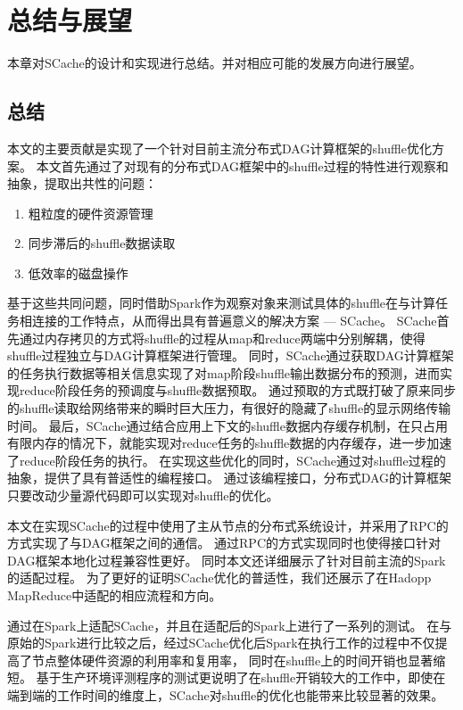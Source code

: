 
\chapter{总结与展望}
\label{chap:summary}

本章对SCache的设计和实现进行总结。并对相应可能的发展方向进行展望。

\section{总结}

本文的主要贡献是实现了一个针对目前主流分布式DAG计算框架的shuffle优化方案。
本文首先通过了对现有的分布式DAG框架中的shuffle过程的特性进行观察和抽象，提取出共性的问题：
\begin{enumerate}
    \item 粗粒度的硬件资源管理
    \item 同步滞后的shuffle数据读取
    \item 低效率的磁盘操作
\end{enumerate}
基于这些共同问题，同时借助Spark作为观察对象来测试具体的shuffle在与计算任务相连接的工作特点，从而得出具有普遍意义的解决方案 --- SCache。
SCache首先通过内存拷贝的方式将shuffle的过程从map和reduce两端中分别解耦，使得shuffle过程独立与DAG计算框架进行管理。
同时，SCache通过获取DAG计算框架的任务执行数据等相关信息实现了对map阶段shuffle输出数据分布的预测，进而实现reduce阶段任务的预调度与shuffle数据预取。
通过预取的方式既打破了原来同步的shuffle读取给网络带来的瞬时巨大压力，有很好的隐藏了shuffle的显示网络传输时间。
最后，SCache通过结合应用上下文的shuffle数据内存缓存机制，在只占用有限内存的情况下，就能实现对reduce任务的shuffle数据的内存缓存，进一步加速了reduce阶段任务的执行。
在实现这些优化的同时，SCache通过对shuffle过程的抽象，提供了具有普适性的编程接口。
通过该编程接口，分布式DAG的计算框架只要改动少量源代码即可以实现对shuffle的优化。

本文在实现SCache的过程中使用了主从节点的分布式系统设计，并采用了RPC的方式实现了与DAG框架之间的通信。
通过RPC的方式实现同时也使得接口针对DAG框架本地化过程兼容性更好。
同时本文还详细展示了针对目前主流的Spark的适配过程。
为了更好的证明SCache优化的普适性，我们还展示了在Hadopp MapReduce中适配的相应流程和方向。

通过在Spark上适配SCache，并且在适配后的Spark上进行了一系列的测试。
在与原始的Spark进行比较之后，经过SCache优化后Spark在执行工作的过程中不仅提高了节点整体硬件资源的利用率和复用率，
同时在shuffle上的时间开销也显著缩短。
基于生产环境评测程序的测试更说明了在shuffle开销较大的工作中，即使在端到端的工作时间的维度上，SCache对shuffle的优化也能带来比较显著的效果。

